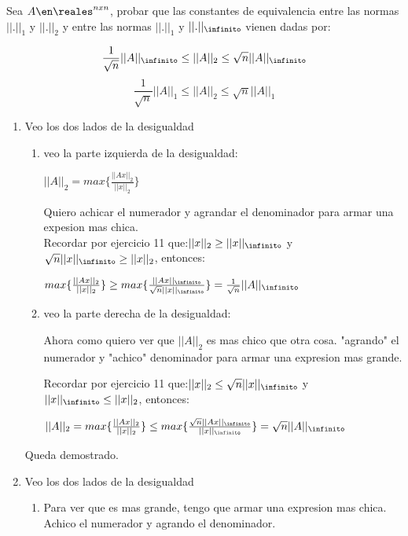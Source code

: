 \begin{enunciado}{\ejercicio}
    Sea $A \en \reales ^{nxn}$, probar que las constantes de equivalencia entre las normas $||.||_1$ y $||.||_2$
    y entre las normas $||.||_1$ y $||.||_\infinito$ vienen dadas por:
    
    $$
    \frac{1}{\sqrt{n}} ||A||_\infinito \leq ||A||_2 \leq \sqrt{n} ||A||_\infinito
    $$
    $$
    \frac{1}{\sqrt{n}} ||A||_1 \leq ||A||_2 \leq \sqrt{n} ||A||_1
    $$
    
    \end{enunciado}
    
    \begin{enumerate}[label=(\alph*)]
    \item 
        Veo los dos lados de la desigualdad
        \begin{enumerate}[label=(\roman*)]
            \item 
            veo la parte izquierda de la desigualdad:
    
            $||A||_2 = max \{\frac{||Ax||_2}{||x||_2} \}$
    
            Quiero  achicar el numerador y agrandar el denominador para armar una expesion mas chica.\\ 
            Recordar por ejercicio 11 que:$||x||_2 \geq ||x||_\infinito$ y $\sqrt{n} ||x||_\infinito \geq  ||x||_2$, entonces:
    
            $max \{\frac{||Ax||_2}{||x||_2} \} \geq max \{\frac{||Ax||_\infinito}{\sqrt{n} ||x||_\infinito} \} = \frac{1}{\sqrt{n}} ||A||_\infinito$ 
            \item 
            veo la parte derecha de la desigualdad:
            
            Ahora como quiero ver que $||A||_2$ es mas chico que otra cosa. "agrando" el numerador y "achico" denominador
            para armar una expresion mas grande.
            
            Recordar por ejercicio 11 que:$||x||_2 \leq \sqrt{n} ||x||_\infinito$ y $||x||_\infinito \leq  ||x||_2$, entonces:
            
            $||A||_2=max \{\frac{||Ax||_2}{||x||_2} \} \leq max \{\frac{\sqrt{n} ||Ax||_\infinito}{||x||_\infinito} \} = \sqrt{n} ||A||_\infinito$ 
        \end{enumerate}
        Queda demostrado.
    \item 
        Veo los dos lados de la desigualdad
        \begin{enumerate}[label=(\roman*)]
            \item
            Para ver que es mas grande, tengo que armar una expresion mas chica. Achico el numerador y agrando el denominador.
            

\end{enumerate}
\end{enumerate}
